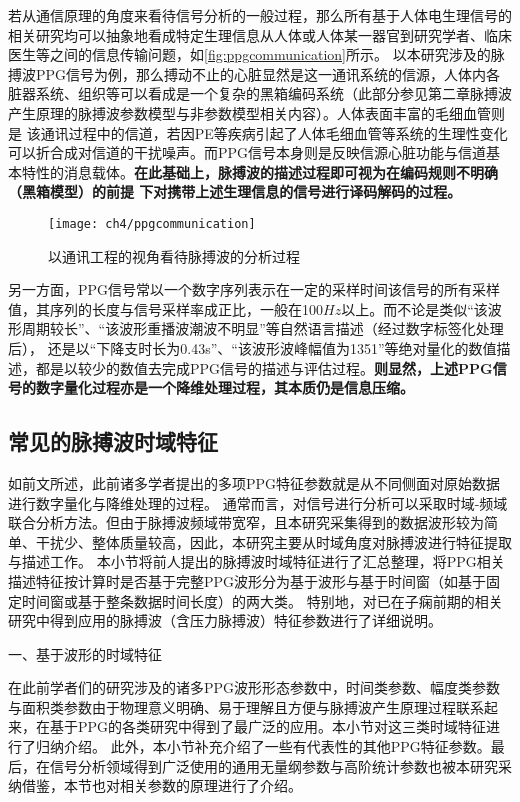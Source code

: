 若从通信原理的角度来看待信号分析的一般过程，那么所有基于人体电生理信号的相关研究均可以抽象地看成特定生理信息从人体或人体某一器官到研究学者、临床医生等之间的信息传输问题，如\autoref{fig:ppgcommunication}所示。
以本研究涉及的脉搏波PPG信号为例，那么搏动不止的心脏显然是这一通讯系统的信源，人体内各脏器系统、组织等可以看成是一个复杂的黑箱编码系统（此部分参见第二章脉搏波产生原理的脉搏波参数模型与非参数模型相关内容）。人体表面丰富的毛细血管则是
该通讯过程中的信道，若因PE等疾病引起了人体毛细血管等系统的生理性变化可以折合成对信道的干扰噪声。而PPG信号本身则是反映信源心脏功能与信道基本特性的消息载体。\textbf{在此基础上，脉搏波的描述过程即可视为在编码规则不明确（黑箱模型）的前提
下对携带上述生理信息的信号进行译码解码的过程。}
\begin{figure}[htbp]
    \centering
    \texttt{[image: ch4/ppgcommunication]}
    \caption{\label{fig:ppgcommunication}以通讯工程的视角看待脉搏波的分析过程}
\end{figure}

另一方面，PPG信号常以一个数字序列表示在一定的采样时间该信号的所有采样值，其序列的长度与信号采样率成正比，一般在100$Hz$以上。而不论是类似“该波形周期较长”、“该波形重播波潮波不明显”等自然语言描述（经过数字标签化处理后），
还是以“下降支时长为0.43s”、“该波形波峰幅值为1351”等绝对量化的数值描述，都是以较少的数值去完成PPG信号的描述与评估过程。\textbf{则显然，上述PPG信号的数字量化过程亦是一个降维处理过程，其本质仍是信息压缩。}

\subsection{常见的脉搏波时域特征}
如前文所述，此前诸多学者提出的多项PPG特征参数就是从不同侧面对原始数据进行数字量化与降维处理的过程。
通常而言，对信号进行分析可以采取时域-频域联合分析方法。但由于脉搏波频域带宽窄，且本研究采集得到的数据波形较为简单、干扰少、整体质量较高，因此，本研究主要从时域角度对脉搏波进行特征提取与描述工作。
本小节将前人提出的脉搏波时域特征进行了汇总整理，将PPG相关描述特征按计算时是否基于完整PPG波形分为基于波形与基于时间窗（如基于固定时间窗或基于整条数据时间长度）的两大类。
特别地，对已在子痫前期的相关研究中得到应用的脉搏波（含压力脉搏波）特征参数进行了详细说明。

一、基于波形的时域特征

在此前学者们的研究涉及的诸多PPG波形形态参数中，时间类参数、幅度类参数与面积类参数由于物理意义明确、易于理解且方便与脉搏波产生原理过程联系起来，在基于PPG的各类研究中得到了最广泛的应用\cite{cwl,mmt}。本小节对这三类时域特征进行了归纳介绍。
此外，本小节补充介绍了一些有代表性的其他PPG特征参数。最后，在信号分析领域得到广泛使用的通用无量纲参数与高阶统计参数也被本研究采纳借鉴，本节也对相关参数的原理进行了介绍。

